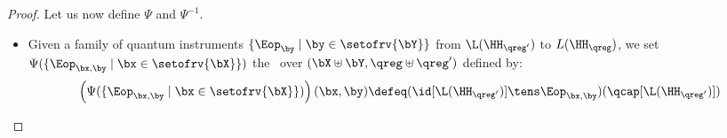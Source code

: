 \begin{proof}
Let us now define $\Psi$ and $\Psi^{-1}$.
\begin{itemize}
\item
Given a family of quantum instruments $\{\Eop_\by \mid \by\in\setofrv{\bY}\}$ from $\L(\HH_{\qreg'})$ to $L(\HH_\qreg)$, we set $\Psi(\{\Eop_{\bx,\by} \mid \bx\in\setofrv{\bX}\})$ the \qfactor\ over $(\bX\uplus\bY,\qreg\uplus\qreg')$ defined by:
\begin{equation*}
\left(\Psi(\{\Eop_{\bx,\by} \mid \bx\in\setofrv{\bX}\})\right)(\bx,\by)
\defeq
(\id[\L(\HH_{\qreg'})] \tens \Eop_{\bx,\by})(\qcap[\L(\HH_{\qreg'})])
\end{equation*}


\end{itemize}
\end{proof}
